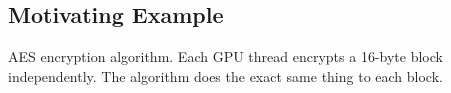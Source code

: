 \subsection{Motivating Example}
AES encryption algorithm. Each GPU thread encrypts a 16-byte block independently.
The algorithm does the exact same thing to each block.




